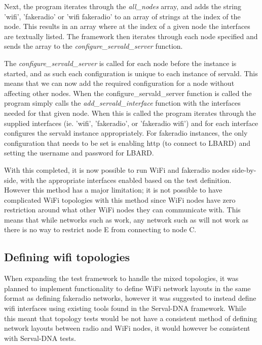 Next, the program iterates through the \emph{all\_nodes} array, and adds the string 'wifi', 'fakeradio' or 'wifi fakeradio' to an array of strings at the index of the node.
This results in an array where at the index of a given node the interfaces are textually listed.
The framework then iterates through each node specified and sends the array to the \emph{configure\_servald\_server} function.


The \emph{configure\_servald\_server} is called for each node before the instance is started, and as such each configuration is unique to each instance of servald.
This means that we can now add the required configuration for a node without affecting other nodes.
When the configure\_servald\_server function is called the program simply calls the \emph{add\_servald\_interface} function with the interfaces needed for that given node.
When this is called the program iterates through the supplied interfaces (ie. 'wifi', 'fakeradio', or 'fakeradio wifi') and for each interface configures the servald instance appropriately.
For fakeradio instances, the only configuration that needs to be set is enabling http (to connect to LBARD) and setting the username and password for LBARD.

With this completed, it is now possible to run WiFi and fakeradio nodes side-by-side, with the appropriate interfaces enabled based on the test definition.
However this method has a major limitation; it is not possible to have complicated WiFi topologies with this method since WiFi nodes have zero restriction around what other WiFi nodes they can communicate with.
This means that while networks such as  work, any network such as  will not work as there is no way to restrict node E from connecting to node C.



\subsection{Defining wifi topologies}
When expanding the test framework to handle the mixed topologies, it was planned to implement functionality to define WiFi network layouts in the same format as defining fakeradio networks, however it was suggested to instead define wifi interfaces using existing tools found in the Serval-DNA framework.
While this meant that topology tests would be not have a consistent method of defining network layouts between radio and WiFi nodes, it would however be consistent with Serval-DNA tests.

